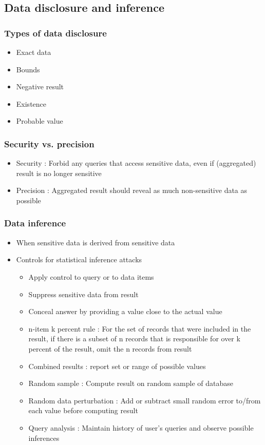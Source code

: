 \documentclass[twoside]{article}
\begin{document}
\subsection{Data disclosure and inference}

\subsubsection{Types of data disclosure}
\begin{itemize}
\item Exact data
\item Bounds 
\item Negative result
\item Existence
\item Probable value
\end{itemize}

\subsubsection{Security vs. precision}
\begin{itemize}
\item Security : Forbid any queries that access sensitive data, even if (aggregated) result is no longer sensitive
\item Precision : Aggregated result should reveal as much non-sensitive data as possible
\end{itemize}

\subsubsection{Data inference}
\begin{itemize}
\item When sensitive data is derived from sensitive data
\item Controls for statistical inference attacks
\begin{itemize}
\item Apply control to query or to data items 
\item Suppress sensitive data from result
\item Conceal answer by providing a value close to the actual value
\item n-item k percent rule : For the set of records that were included in the result, if there is a subset of n records that is responsible for over
k percent of the result, omit the n records from result
\item Combined results : report set or range of possible values
\item Random sample : Compute result on random sample of database
\item Random data perturbation : Add or subtract small random error to/from each value before computing result
\item Query analysis :  Maintain history of user’s queries and observe possible
inferences
\end{itemize}
\end{itemize}
\end{document}
